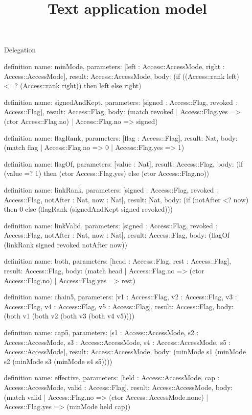 \begin{lexlean}{Delegation}
\title{Text application model}
\begin{semanticmodule}
definition{
  name: minMode,
  parameters: [left : Access::AccessMode, right : Access::AccessMode],
  result: Access::AccessMode,
  body: (if ((Access::rank left) <=? (Access::rank right)) then left else right)
}

definition{
  name: signedAndKept,
  parameters: [signed : Access::Flag, revoked : Access::Flag],
  result: Access::Flag,
  body: (match revoked
    | Access::Flag.yes => (ctor Access::Flag.no)
    | Access::Flag.no => signed)
}

definition{
  name: flagRank,
  parameters: [flag : Access::Flag],
  result: Nat,
  body: (match flag
    | Access::Flag.no => 0
    | Access::Flag.yes => 1)
}

definition{
  name: flagOf,
  parameters: [value : Nat],
  result: Access::Flag,
  body: (if (value =? 1) then (ctor Access::Flag.yes) else (ctor Access::Flag.no))
}

definition{
  name: linkRank,
  parameters: [signed : Access::Flag, revoked : Access::Flag, notAfter : Nat, now : Nat],
  result: Nat,
  body: (if (notAfter <? now) then 0 else (flagRank (signedAndKept signed revoked)))
}

definition{
  name: linkValid,
  parameters: [signed : Access::Flag, revoked : Access::Flag, notAfter : Nat, now : Nat],
  result: Access::Flag,
  body: (flagOf (linkRank signed revoked notAfter now))
}

definition{
  name: both,
  parameters: [head : Access::Flag, rest : Access::Flag],
  result: Access::Flag,
  body: (match head
    | Access::Flag.no => (ctor Access::Flag.no)
    | Access::Flag.yes => rest)
}

definition{
  name: chain5,
  parameters: [v1 : Access::Flag, v2 : Access::Flag, v3 : Access::Flag, v4 : Access::Flag, v5 : Access::Flag],
  result: Access::Flag,
  body: (both v1 (both v2 (both v3 (both v4 v5))))
}

definition{
  name: cap5,
  parameters: [s1 : Access::AccessMode, s2 : Access::AccessMode, s3 : Access::AccessMode, s4 : Access::AccessMode, s5 : Access::AccessMode],
  result: Access::AccessMode,
  body: (minMode s1 (minMode s2 (minMode s3 (minMode s4 s5))))
}

definition{
  name: effective,
  parameters: [held : Access::AccessMode, cap : Access::AccessMode, valid : Access::Flag],
  result: Access::AccessMode,
  body: (match valid
    | Access::Flag.no => (ctor Access::AccessMode.none)
    | Access::Flag.yes => (minMode held cap))
}
\end{semanticmodule}
\end{lexlean}
